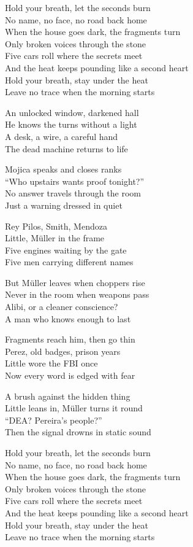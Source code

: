 \begin{lyrics}
Hold your breath, let the seconds burn\\
No name, no face, no road back home\\
When the house goes dark, the fragments turn\\
Only broken voices through the stone\\
Five cars roll where the secrets meet\\
And the heat keeps pounding like a second heart\\
Hold your breath, stay under the heat\\
Leave no trace when the morning starts

An unlocked window, darkened hall\\
He knows the turns without a light\\
A desk, a wire, a careful hand\\
The dead machine returns to life

Mojica speaks and closes ranks\\
“Who upstairs wants proof tonight?”\\
No answer travels through the room\\
Just a warning dressed in quiet

Rey Pilos, Smith, Mendoza\\
Little, Müller in the frame\\
Five engines waiting by the gate\\
Five men carrying different names

But Müller leaves when choppers rise\\
Never in the room when weapons pass\\
Alibi, or a cleaner conscience?\\
A man who knows enough to last

Fragments reach him, then go thin\\
Perez, old badges, prison years\\
Little wore the FBI once\\
Now every word is edged with fear

A brush against the hidden thing\\
Little leans in, Müller turns it round\\
“DEA? Pereira’s people?”\\
Then the signal drowns in static sound

Hold your breath, let the seconds burn\\
No name, no face, no road back home\\
When the house goes dark, the fragments turn\\
Only broken voices through the stone\\
Five cars roll where the secrets meet\\
And the heat keeps pounding like a second heart\\
Hold your breath, stay under the heat\\
Leave no trace when the morning starts


\end{lyrics}
